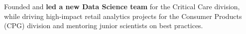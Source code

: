 \documentclass[letterpaper,11pt]{article}
\newcommand{\resumeItem}[1]{
  \item{\small{#1}}
}
\begin{document}







    \resumeItem{Founded and \textbf{led a new Data Science team} for the Critical Care division, while driving high-impact retail analytics projects for the Consumer Products (CPG) division and mentoring junior scientists on best practices.}




\end{document}
